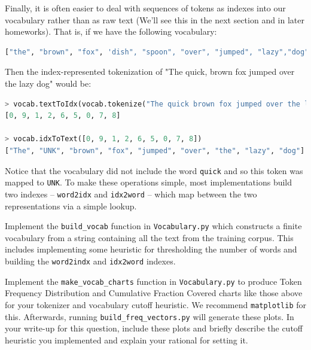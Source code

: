 \documentclass[a4paper,10pt]{article}
\begin{document}
Finally, it is often easier to deal with sequences of tokens as indexes into our vocabulary rather than as raw text (We'll see this in the next section and in later homeworks). That is, if we have the following vocabulary:
%
\begin{center}
\begin{minipage}{0.95\textwidth}
\begin{lstlisting}[language=Python]
["the", "brown", "fox", 'dish", "spoon", "over", "jumped", "lazy","dog", "UNK"]
\end{lstlisting}
\end{minipage}
\end{center}
%
Then the index-represented tokenization of "The quick, brown fox jumped over the lazy dog" would be:
%
\begin{center}
\begin{minipage}{0.95\textwidth}
\begin{lstlisting}[language=Python]
> vocab.textToIdx(vocab.tokenize("The quick brown fox jumped over the lazy dog."))
[0, 9, 1, 2, 6, 5, 0, 7, 8]

> vocab.idxToText([0, 9, 1, 2, 6, 5, 0, 7, 8])
["The", "UNK", "brown", "fox", "jumped", "over", "the", "lazy", "dog"]
\end{lstlisting}
\end{minipage}
\end{center}
%
Notice that the vocabulary did not include the word \texttt{quick} and so this token was mapped to \texttt{UNK}. To make these operations simple, most implementations build two indexes -- \texttt{word2idx} and \texttt{idx2word} -- which map between the two representations via a simple lookup.


\vspace{5pt}
\begin{taskbox}
 Implement the \texttt{build\_vocab} function in \texttt{Vocabulary.py} which constructs a finite vocabulary from a string containing all the text from the training corpus. This includes implementing some heuristic for thresholding the number of words and building the \texttt{word2indx} and \texttt{idx2word} indexes.


 Implement the \texttt{make\_vocab\_charts} function in \texttt{Vocabulary.py} to produce Token Frequency Distribution and Cumulative Fraction Covered charts like those above for your tokenizer and vocabulary cutoff heuristic. We recommend \texttt{matplotlib} for this. Afterwards, running \texttt{build\_freq\_vectors.py} will generate these plots. In your write-up for this question, include these plots and briefly describe the cutoff heuristic you implemented and explain your rational for setting it. 
\end{taskbox}
\vspace{5pt}
\end{document}
